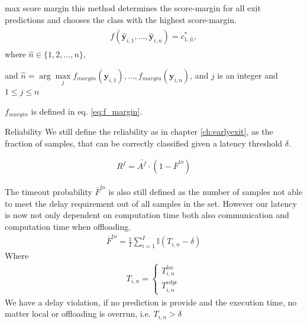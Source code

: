 \begin{enumdescript}
\begin{enumdescript}
			
			\item[max score margin] this method determines the score-margin for all exit predictions and chooses the class with the highest score-margin. 
			\begin{align}
			\begin{split}
			f\left(\bm{\hat{y}}_{i,1}, \dots, \bm{\hat{y}}_{i,n} \right) =c^*_{1,\hat{n}},
			\end{split}	
			\end{align}
			where $ \hat{n} \in \{1, 2, ..., n\} $, 
			
			and $ \hat{n} = \arg \underset{j}{\max} {f_{margin}(\bm{y}_{i,1}), ..., f_{margin}(\bm{y}_{i,n}) } $, 
			and $ j $ is an integer and $ 1 \le j \le n $
			
			$ f_{margin} $ is defined in eq. \ref{eq:f_margin}.
		\end{enumdescript}
	
		\item[Reliability]  We still define the reliability as in chapter \ref{ch:earlyexit}, as the fraction of samples, that can be correctly classified given a latency threshold $ \delta $.
		
		\begin{align}
		R^f= \bar{A^f} \cdot (1-\overline{F}^{to})
		\end{align}
		
		The timeout probability $ \overline{F}^{to} $ is also still defined as the number of samples not able to meet the delay requirement out of all samples in the set. However our latency is now not only dependent on computation time both also communication and computation time when offloading.
		\begin{align}
		\overline{F}^{to}=\frac{1}{I}\sum_{i=1}^{I} \mathbb{I}\left(T_{i,n}-\delta\right)
		\end{align}
		Where
		\begin{align}
			T_{i,n} = \begin{cases}
				T_{i,n}^{loc} \\
				T_{i,n}^{edge}
			\end{cases}
		\end{align}
		We have a delay violation, if no prediction is provide and the execution time, no matter local or offloading is overrun, i.e. $ T_{i,n} > \delta $  
	

\end{enumdescript}
